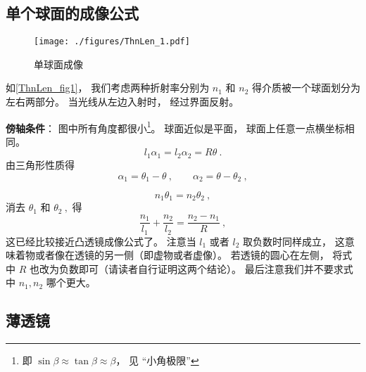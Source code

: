 


\subsection{单个球面的成像公式}
\begin{figure}[ht]
\centering
\texttt{[image: ./figures/ThnLen\_1.pdf]}
\caption{单球面成像} \label{ThnLen_fig1}
\end{figure}

如\autoref{ThnLen_fig1}， 我们考虑两种折射率分别为 $n_1$ 和 $n_2$ 得介质被一个球面划分为左右两部分。 当光线从左边入射时， 经过界面反射。

\textbf{傍轴条件}： 图中所有角度都很小\footnote{即 $\sin\beta \approx \tan\beta \approx \beta$， 见 “小角极限”}。 球面近似是平面， 球面上任意一点横坐标相同。
\begin{equation}
l_1 \alpha_1 = l_2 \alpha_2 = R\theta~.
\end{equation}
由三角形性质得
\begin{equation}
\alpha_1 = \theta_1 - \theta ~,\qquad
\alpha_2 = \theta - \theta_2~,
\end{equation}

\begin{equation}
n_1 \theta_1 = n_2 \theta_2~,
\end{equation}
消去 $\theta_1$ 和 $\theta_2~,$ 得
\begin{equation}
\frac{n_1}{l_1} + \frac{n_2}{l_2} = \frac{n_2 - n_1}{R}~,
\end{equation}
这已经比较接近凸透镜成像公式了。 注意当 $l_1$ 或者 $l_2$ 取负数时同样成立， 这意味着物或者像在透镜的另一侧（即虚物或者虚像）。 若透镜的圆心在左侧， 将式中 $R$ 也改为负数即可（请读者自行证明这两个结论）。 最后注意我们并不要求式中 $n_1, n_2$ 哪个更大。

\subsection{薄透镜}

